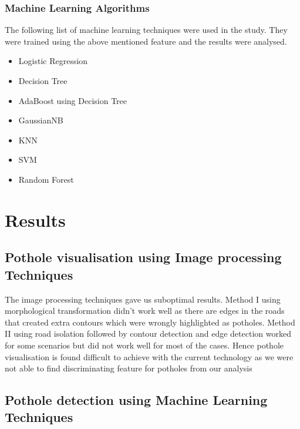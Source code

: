 \documentclass[journal]{IEEEtran}
\begin{document}
\subsubsection{Machine Learning Algorithms}

The following list of machine learning techniques were used in the study. They were trained using the above mentioned feature and the results were analysed.

\begin{itemize}
\item Logistic Regression \cite{lr}
\item Decision Tree \cite{dt}
\item AdaBoost using Decision Tree
\item GaussianNB
\item KNN \cite{knn}
\item SVM \cite{svm}
\item Random Forest \cite{rf}
\end{itemize}

\section{Results}


\subsection{Pothole visualisation using Image processing Techniques}

The image processing techniques gave us suboptimal results. Method I using morphological transformation didn't work well as there are edges in the roads that created extra contours which were wrongly highlighted as potholes. Method II using road isolation followed by contour detection and edge detection worked for some scenarios but did not work well for most of the cases. Hence pothole visualisation is found difficult to achieve with the current technology as we were not able to find discriminating feature for potholes from our analysis

\subsection{Pothole detection using Machine Learning Techniques}
\end{document}
